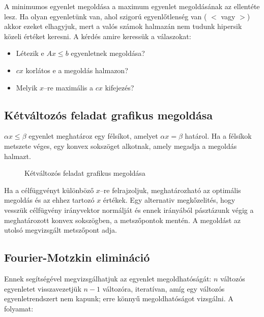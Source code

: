 A minimumos egyenlet megoldása a maximum egyenlet megoldásának az ellentéte
lesz. Ha olyan egyenletünk van, ahol szigorú egyenlőtlenség van ( $<$ vagy $>$)
akkor ezeket elhagyjuk, mert a valós számok halmazán nem tudunk hipersik közeli
értéket keresni. A kérdés amire keressük a válaszokat:

\begin{itemize}
  \item Létezik e $Ax \leq b$ egyenletnek megoldása?
  \item $cx$ korlátos e a megoldás halmazon?
  \item Melyik $x$--re maximális a $cx$ kifejezés?
\end{itemize}

\subsection{Kétváltozós feladat grafikus megoldása}

$\alpha x \leq \beta$ egyenlet meghatároz egy félsíkot, amelyet $\alpha x = \beta$
határol. Ha a félsíkok metszete véges, egy konvex sokszöget alkotnak, amely megadja a
megoldás halmazt.

\begin{figure}[htbp]
\centering
{}
\caption{Kétváltozós feladat grafikus megoldása} \label{fig:KetValtGraf}
\end{figure}

Ha a célfüggvényt különböző $x$--re felrajzoljuk, meghatározható az optimális
megoldás és az ehhez tartozó $x$ értékek. Egy alternativ megkőzelités, hogy
vesszük célfügvény irányvektor normálját és ennek irányából pásztázunk végig a
meghatározott konvex sokszögben, a metszőpontok mentén. A megoldást az utolsó
megvizsgált metszőpont adja.

\subsection{Fourier-Motzkin elimináció}

Ennek segítségével megvizsgálhatjuk az egyenlet megoldhatóságát: $n$ változós
egyenletet visszavezetjük $n-1$ változóra, iteratívan, amíg egy változós
egyenletrendszert nem kapunk; erre könnyű megoldhatóságot vizsgálni. A folyamat:

